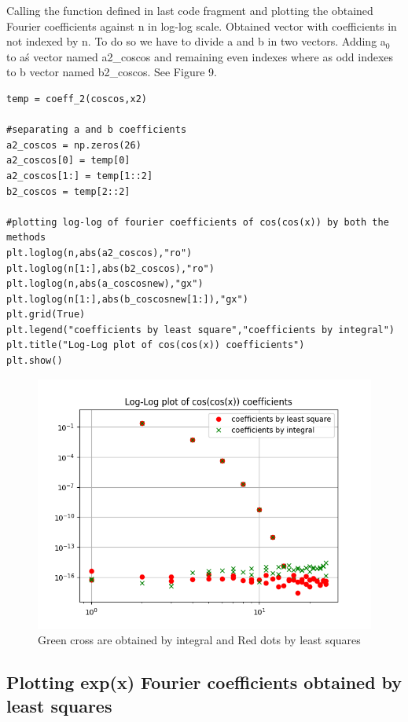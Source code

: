 \documentclass[a4paper]{article}
\begin{document}
Calling the function defined in last code fragment and plotting the obtained Fourier coefficients against n in log-log scale. Obtained vector with coefficients in not indexed by n. To do so we have to divide a and b in two vectors. Adding a$_{0}$ to a\'s vector named a2\_coscos and remaining even indexes where as odd indexes to b vector named b2\_coscos. See Figure 9.
\begin{lstlisting}
temp = coeff_2(coscos,x2)

#separating a and b coefficients
a2_coscos = np.zeros(26)
a2_coscos[0] = temp[0]
a2_coscos[1:] = temp[1::2]
b2_coscos = temp[2::2]

#plotting log-log of fourier coefficients of cos(cos(x)) by both the methods
plt.loglog(n,abs(a2_coscos),"ro")
plt.loglog(n[1:],abs(b2_coscos),"ro")
plt.loglog(n,abs(a_coscosnew),"gx")
plt.loglog(n[1:],abs(b_coscosnew[1:]),"gx")
plt.grid(True)
plt.legend("coefficients by least square","coefficients by integral")
plt.title("Log-Log plot of cos(cos(x)) coefficients")
plt.show()
\end{lstlisting}
\begin{figure}
\includegraphics[width=\columnwidth]{coscoscoeffcom.png}
\caption{Green cross are obtained by integral and Red dots by least squares }
\end{figure}
\subsection{Plotting exp(x) Fourier coefficients obtained by least squares}
\end{document}
